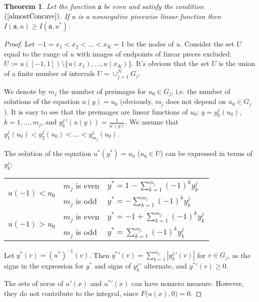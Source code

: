 \documentclass[12pt]{article}
\newcommand{\abs}[1]{\left\vert#1\right\vert}
\renewcommand{\ge}{\geqslant}
\newtheorem{thm}{Theorem}
\begin{document}
\begin{thm}
\label{linth}
Let the function $\mathfrak a$ be even and satisfy the condition $(\ref{almostConcave})$.
If $u$ is a nonnegative piecewise linear function then $I(\mathfrak a, u) \ge I(\mathfrak a, u^*)$.
\end{thm}

\begin{proof}
Let $-1 = x_1 < x_2 < \dots < x_K = 1$ be the nodes of $u$.
Consider the set $U$ equal to the range of $u$ with images of endpoints of linear pieces excluded:
$U := u( [-1, 1] ) \setminus \{ u(x_1), \dots, u(x_K) \}$.
It's obvious that the set $U$ is the union of a finite number of intervals $U = \cup_{j = 1}^N G_j$.

We denote by $m_j$ the number of preimages for $u_0 \in G_j$,
i.e. the number of solutions of the equation $u(y) = u_0$
(obviously, $m_j$ does not depend on $u_0 \in G_j$).
It is easy to see that the preimages are linear functions of $u_0$:
$y = y_k^j(u_0)$, $k = 1, \dots, m_j$,
and $y_k^j{}'(u(y)) = \frac{1}{u'(y)}$.
We assume that $y_1^j(u_0) < y_2^j(u_0) < \dots < y_{m_j}^j(u_0)$.

The solution of the equation $u^*(y^*)=u_0$ ($u_0 \in U$) can be expressed in terms of $y_k^j$:

\begin{center}
\begin{tabular}{l|l|l} 
\multirow{2}{*}{$u(-1)<u_0$ \rule[-34pt]{0pt}{65pt}} & $m_j$ is even & $y^*=1-\sum\limits_{k=1}^{m_j} (-1)^k y_k^j$ \rule[-17pt]{0pt}{40pt} \\
                                                     & $m_j$ is odd  & $y^*=-\sum\limits_{k=1}^{m_j} (-1)^k y_k^j$ \rule[-17pt]{0pt}{40pt} \\ \hline
\multirow{2}{*}{$u(-1)>u_0$ \rule[-34pt]{0pt}{65pt}} & $m_j$ is even & $y^*=-1+\sum\limits_{k=1}^{m_j} (-1)^k y_k^j$ \rule[-17pt]{0pt}{40pt} \\
                                                     & $m_j$ is odd  & $y^*=\sum\limits_{k=1}^{m_j} (-1)^k y_k^j$ \rule[-17pt]{0pt}{40pt} \\ 
\end{tabular}
\end{center}

Let $y^*(v) = (u^*)^{-1}(v)$.
Then $y^*{}'(v) = \sum_{k=1}^{m_j} \abs{y_k^j{}'(v)}$ for $v \in G_j$, as the signs in the expression for
$y^*$ and signs of $y_k^j{}'$ alternate, and $y^*{}'(v)\ge 0$.

The sets of zeros of $u'(x)$ and $u^*{}'(x)$ can have nonzero measure.
However, they do not contribute to the integral, since $F\big(u(x), 0\big) = 0$.


\end{proof}
\end{document}
